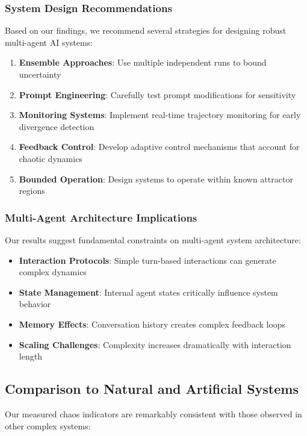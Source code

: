 \documentclass[11pt,a4paper]{article}
\begin{document}
\subsubsection{System Design Recommendations}

Based on our findings, we recommend several strategies for designing robust multi-agent AI systems:

\begin{enumerate}
    \item \textbf{Ensemble Approaches}: Use multiple independent runs to bound uncertainty
    \item \textbf{Prompt Engineering}: Carefully test prompt modifications for sensitivity
    \item \textbf{Monitoring Systems}: Implement real-time trajectory monitoring for early divergence detection
    \item \textbf{Feedback Control}: Develop adaptive control mechanisms that account for chaotic dynamics
    \item \textbf{Bounded Operation}: Design systems to operate within known attractor regions
\end{enumerate}

\subsubsection{Multi-Agent Architecture Implications}

Our results suggest fundamental constraints on multi-agent system architecture:

\begin{itemize}
    \item \textbf{Interaction Protocols}: Simple turn-based interactions can generate complex dynamics
    \item \textbf{State Management}: Internal agent states critically influence system behavior
    \item \textbf{Memory Effects}: Conversation history creates complex feedback loops
    \item \textbf{Scaling Challenges}: Complexity increases dramatically with interaction length
\end{itemize}

\subsection{Comparison to Natural and Artificial Systems}

Our measured chaos indicators are remarkably consistent with those observed in other complex systems:
\end{document}
